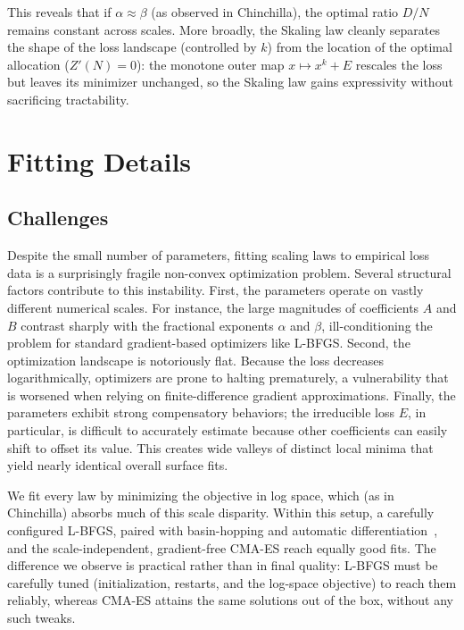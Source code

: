 \documentclass[]{fairmeta}
\newcommand{\ska}{Skaling}
\begin{document}
This reveals that if $\alpha \approx \beta$ (as observed in Chinchilla), the optimal ratio $D/N$ remains constant across scales. More broadly, the \ska{} law cleanly separates the shape of the loss landscape (controlled by $k$) from the location of the optimal allocation ($Z'(N) = 0$): the monotone outer map $x \mapsto x^{k} + E$ rescales the loss but leaves its minimizer unchanged, so the \ska{} law gains expressivity without sacrificing tractability.

\section{Fitting Details}
\label{app:fitting}
\subsection{Challenges}
Despite the small number of parameters, fitting scaling laws to empirical loss data is a surprisingly fragile non-convex optimization problem. Several structural factors contribute to this instability. First, the parameters operate on vastly different numerical scales. For instance, the large magnitudes of coefficients $A$ and $B$ contrast sharply with the fractional exponents $\alpha$ and $\beta$, ill-conditioning the problem for standard gradient-based optimizers like L-BFGS. Second, the optimization landscape is notoriously flat. Because the loss decreases logarithmically, optimizers are prone to halting prematurely, a vulnerability that is worsened when relying on finite-difference gradient approximations. Finally, the parameters exhibit strong compensatory behaviors; the irreducible loss $E$, in particular, is difficult to accurately estimate because other coefficients can easily shift to offset its value. This creates wide valleys of distinct local minima that yield nearly identical overall surface fits.

We fit every law by minimizing the objective in log space, which (as in Chinchilla) absorbs much of this scale disparity. Within this setup, a carefully configured L-BFGS, paired with basin-hopping and automatic differentiation~\citep{besiroglu2024chinchilla,shukor2026scaling}, and the scale-independent, gradient-free CMA-ES reach equally good fits. The difference we observe is practical rather than in final quality: L-BFGS must be carefully tuned (initialization, restarts, and the log-space objective) to reach them reliably, whereas CMA-ES attains the same solutions out of the box, without any such tweaks.
\end{document}
